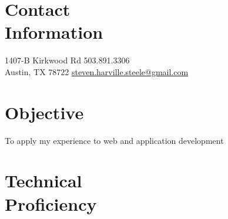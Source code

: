 \documentclass[margin,line]{resume}
\begin{document}
\begin{resume}

\vspace{1em}

\section{\mysidestyle Contact\\Information}

1407-B Kirkwood Rd \hfill 503.891.3306 \\
Austin, TX  78722 \hfill \href{mailto:steven.harville.steele@gmail.com}{steven.harville.steele@gmail.com} \\\vspace{-4.5mm}

\section{\mysidestyle Objective}


	To apply my experience to web and application development






\section{\mysidestyle Technical\\Proficiency}


\end{resume}
\end{document}
